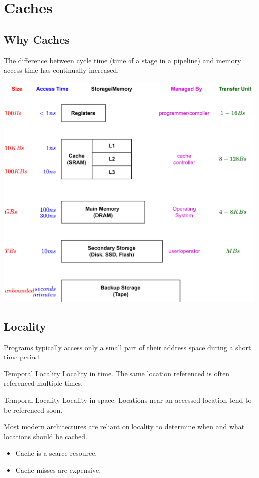 \chapter{Caches}
\section{Why Caches}
The difference between cycle time (time of a stage in a pipeline) and memory access time has continually increased.
\begin{center}
	\includegraphics[width=.9\textwidth]{caches/images/memory_hierarchy.drawio.png}
\end{center}
\section{Locality}
Programs typically access only a small part of their address space during a short time period.
\begin{tcbraster}[raster columns=2,raster equal height]
	\begin{definitionbox}{Temporal Locality}
		Locality in time. The same location referenced is often referenced multiple times.
	\end{definitionbox}
	\begin{definitionbox}{Temporal Locality}
		Locality in space. Locations near an accessed location tend to be referenced soon.
	\end{definitionbox}
\end{tcbraster}
Most modern architectures are reliant on locality to determine when and what locations should be cached.
\begin{itemize}
	\item Cache is a scarce resource.
	\item Cache misses are expensive.
\end{itemize}

